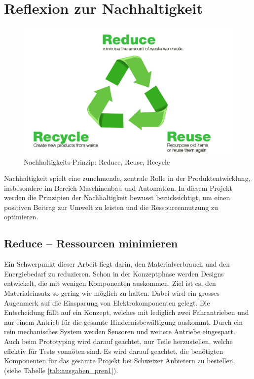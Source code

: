 \documentclass[../main.tex]{subfiles}
\begin{document}
\newpage
\section{Reflexion zur Nachhaltigkeit}

\begin{figure}[H] %
    \centering
        \includegraphics[width=0.7\linewidth]{img/nachhaltigkeit/3R-reduce-reuse-recycle.jpg}
        \caption[Nachhaltigkeits-Prinzip: Reduce, Reuse, Recycle]{Nachhaltigkeits-Prinzip: Reduce, Reuse, Recycle \footnotemark}
        
        \label{fig:3R}
    \end{figure} 


Nachhaltigkeit spielt eine zunehmende, zentrale Rolle in der Produktentwicklung, insbesondere im Bereich Maschinenbau und Automation. In diesem Projekt werden die Prinzipien der Nachhaltigkeit bewusst berücksichtigt, um einen positiven Beitrag zur Umwelt zu leisten und die Ressourcennutzung zu optimieren.

\subsection{Reduce – Ressourcen minimieren}

Ein Schwerpunkt dieser Arbeit liegt darin, den Materialverbrauch und den Energiebedarf zu reduzieren. Schon in der Konzeptphase werden Designs entwickelt, die mit wenigen Komponenten auskommen. Ziel ist es, den Materialeinsatz so gering wie möglich zu halten. Dabei wird ein grosses Augenmerk auf die Einsparung von Elektrokomponenten gelegt. Die Entscheidung fällt auf ein Konzept, welches mit lediglich zwei Fahrantrieben und nur einem Antrieb für die gesamte Hindernisbewältigung auskommt. Durch ein rein mechanisches System werden Sensoren und weitere Antriebe eingespart. Auch beim Prototyping wird darauf geachtet, nur Teile herzustellen, welche effektiv für Tests vonnöten sind. Es wird darauf geachtet, die benötigten Komponenten für das gesamte Projekt bei Schweizer Anbietern zu bestellen, (siehe Tabelle \ref{tab:ausgaben_pren1}).
\end{document}
